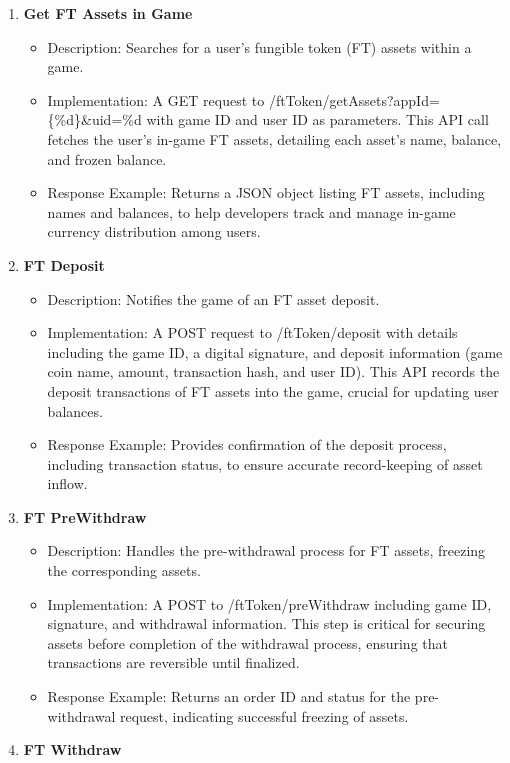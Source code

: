 \begin{enumerate}
    \item \textbf{Get FT Assets in Game}
    \begin{itemize}
        \item Description: Searches for a user's fungible token (FT) assets within a game.
\item Implementation: A GET request to /ftToken/getAssets?appId=\{\%d\}\&uid={\%d} with game ID and user ID as parameters. This API call fetches the user's in-game FT assets, detailing each asset's name, balance, and frozen balance.
\item Response Example: Returns a JSON object listing FT assets, including names and balances, to help developers track and manage in-game currency distribution among users.
 \end{itemize}
\item \textbf{FT Deposit}
\begin{itemize}
        \item Description: Notifies the game of an FT asset deposit.
\item Implementation: A POST request to /ftToken/deposit with details including the game ID, a digital signature, and deposit information (game coin name, amount, transaction hash, and user ID). This API records the deposit transactions of FT assets into the game, crucial for updating user balances.
\item Response Example: Provides confirmation of the deposit process, including transaction status, to ensure accurate record-keeping of asset inflow.
\end{itemize}
\item \textbf{FT PreWithdraw}
\begin{itemize}
        \item Description: Handles the pre-withdrawal process for FT assets, freezing the corresponding assets.
\item Implementation: A POST to /ftToken/preWithdraw including game ID, signature, and withdrawal information. This step is critical for securing assets before completion of the withdrawal process, ensuring that transactions are reversible until finalized.
\item Response Example: Returns an order ID and status for the pre-withdrawal request, indicating successful freezing of assets.
\end{itemize}
\item \textbf{FT Withdraw}
\begin{itemize}

\end{itemize}
\end{enumerate}
